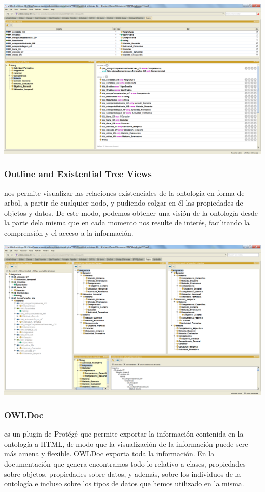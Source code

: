 \begin{center}
		\includegraphics[width=1.00\textwidth]{Imagenes/Herramientas-CardinalityView.png}
\end{center}

\subsubsection{Outline and Existential Tree Views} nos permite visualizar las relaciones existenciales de la ontología en forma de arbol, a partir de cualquier nodo, y pudiendo colgar en él las propiedades de objetos y datos. De este modo, podemos obtener una visión de la ontología desde la parte dela misma que en cada momento nos resulte de interés, facilitando la comprensión y el acceso a la información.

\begin{center}
		\includegraphics[width=1.00\textwidth]{Imagenes/Herramientas-ExistentialTree.png}
\end{center}

\subsubsection{OWLDoc} es un plugin de Protégé que permite exportar la información contenida en la ontología a HTML, de modo que la visualización de la información puede sere más amena y flexible. OWLDoc exporta toda la información. En la documentación que genera encontramos todo lo relativo a clases, propiedades sobre objetos, propiedades sobre datos, y además, sobre los individuos de la ontología e incluso sobre los tipos de datos que hemos utilizado en la misma.

